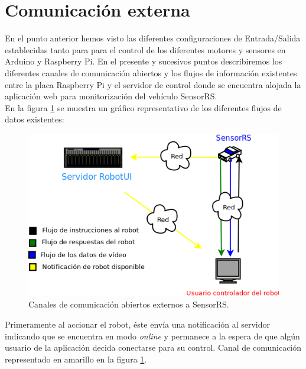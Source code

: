 \section{Comunicación externa}

En el punto anterior hemos visto las diferentes configuraciones de Entrada/Salida establecidas tanto para para el control de los diferentes motores y sensores en Arduino y Raspberry Pi. 
En el presente y sucesivos puntos describiremos los diferentes canales de comunicación abiertos y los flujos de información existentes entre la placa Raspberry Pi y el servidor de control donde 
se encuentra alojada la aplicación web para monitorización del vehículo SensorRS.\\

En la figura \ref{figura:comunicaciones-robot} se muestra un gráfico representativo de los diferentes flujos de datos existentes:

\begin{figure}[H]
  \begin{center}
    \includegraphics[scale=0.6]{diagramas/flujo-comunicaciones-robot.png}
  \end{center}
  \caption{Canales de comunicación abiertos externos a SensorRS.}
  \label{figura:comunicaciones-robot}
\end{figure}

Primeramente al accionar el robot, éste envía una notificación al servidor indicando que se encuentra en modo \emph{online} y permanece a la espera de que algún usuario de la aplicación decida
conectarse para su control. Canal de comunicación representado en amarillo en la figura \ref{figura:comunicaciones-robot}.\\

